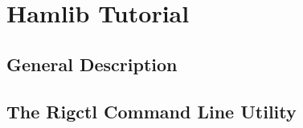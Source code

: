 \section{Hamlib Tutorial}\label{sec:hamlib}

\subsection{General Description}

\subsection{The Rigctl Command Line Utility}
